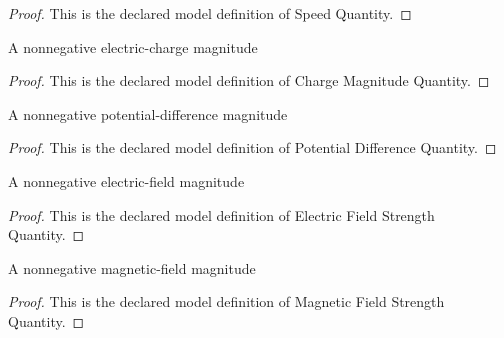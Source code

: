 \begin{proof}
  This is the declared model definition of Speed Quantity.
\end{proof}
\begin{definition}
  \label{def:physics:phyx-mini-0639:phyxminiproblems-problemphyxmini0639-chargemagnitudequantity}
  A nonnegative electric-charge magnitude
\end{definition}
\begin{proof}
  This is the declared model definition of Charge Magnitude Quantity.
\end{proof}
\begin{definition}
  \label{def:physics:phyx-mini-0639:phyxminiproblems-problemphyxmini0639-potentialdifferencequantity}
  A nonnegative potential-difference magnitude
\end{definition}
\begin{proof}
  This is the declared model definition of Potential Difference Quantity.
\end{proof}
\begin{definition}
  \label{def:physics:phyx-mini-0639:phyxminiproblems-problemphyxmini0639-electricfieldstrengthquantity}
  A nonnegative electric-field magnitude
\end{definition}
\begin{proof}
  This is the declared model definition of Electric Field Strength Quantity.
\end{proof}
\begin{definition}
  \label{def:physics:phyx-mini-0639:phyxminiproblems-problemphyxmini0639-magneticfieldstrengthquantity}
  A nonnegative magnetic-field magnitude
\end{definition}
\begin{proof}
  This is the declared model definition of Magnetic Field Strength Quantity.
\end{proof}
